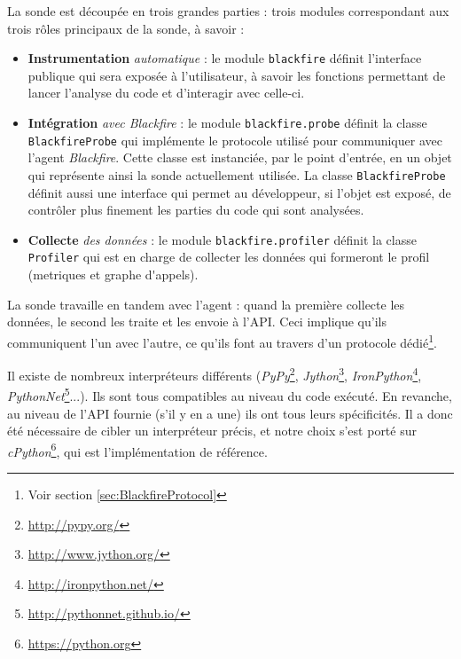 La sonde est découpée en trois grandes parties : trois modules correspondant aux trois rôles principaux de la sonde, à savoir :
\begin{itemize}
\item \textbf{Instrumentation} \emph{automatique} : le module \texttt{blackfire} définit l'interface publique qui sera exposée à l'utilisateur, à savoir les fonctions permettant de lancer l'analyse du code et d’interagir avec celle-ci.
\item \textbf{Intégration} \emph{avec Blackfire} : le module \texttt{blackfire.probe} définit la classe \\\texttt{BlackfireProbe} qui implémente le protocole utilisé pour communiquer avec l'agent \emph{Blackfire}. Cette classe est instanciée, par le point d'entrée, en un objet qui représente ainsi la sonde actuellement utilisée. La classe \texttt{BlackfireProbe} définit aussi une interface qui permet au développeur, si l'objet est exposé, de contrôler plus finement les parties du code qui sont analysées.
\item \textbf{Collecte} \emph{des données} : le module \texttt{blackfire.profiler} définit la classe \texttt{Profiler} qui est en charge de collecter les données qui formeront le profil (\glspl{metrique} et \gls{graphe d'appels}).
\end{itemize}

\begin{note}
La sonde travaille en tandem avec l'agent : quand la première collecte les données, le second les traite et les envoie à l'API. Ceci implique qu'ils communiquent l'un avec l'autre, ce qu'ils font au travers d'un protocole dédié\footnote{Voir section \vref{sec:BlackfireProtocol}}.
\end{note}

\begin{note}[cPython]
Il existe de nombreux interpréteurs \Python différents (\emph{PyPy}\footnote{\url{http://pypy.org/}}, \emph{Jython}\footnote{\url{http://www.jython.org/}}, \emph{IronPython}\footnote{\url{http://ironpython.net/}}, \emph{PythonNet}\footnote{\url{http://pythonnet.github.io/}}...). Ils sont tous compatibles au niveau du code \Python exécuté. En revanche, au niveau de l'API \C fournie (s'il y en a une) ils ont tous leurs spécificités. Il a donc été nécessaire de cibler un interpréteur précis, et notre choix s'est porté sur \emph{cPython}\footnote{\url{https://python.org}}, qui est l'implémentation de référence.
\end{note}

